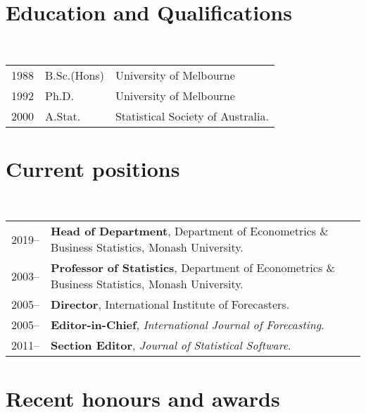 \documentclass[a4paper,10pt]{article}
\begin{document}
\maketitle

\section{Education and Qualifications}

~\begin{tabular}{lll}
1988 & B.Sc.(Hons) & University of Melbourne\\
1992 & Ph.D. & University of Melbourne\\
2000 & A.Stat. & Statistical Society of Australia.
\end{tabular}


\section{Current positions}

~\begin{tabular}{lP{15cm}}
2019--& \textbf{Head of Department},
        Department of Econometrics \& Business Statistics, Monash University.\\
2003--& \textbf{Professor of Statistics},
        Department of Econometrics \& Business Statistics, Monash University.\\
2005--& \textbf{Director},
        International Institute of Forecasters.\\
2005--& \textbf{Editor-in-Chief},
        \textit{International Journal of Forecasting}.\\
2011--& \textbf{Section Editor}, \textit{Journal of Statistical Software}.
\end{tabular}



\section{Recent honours and awards}
\end{document}

